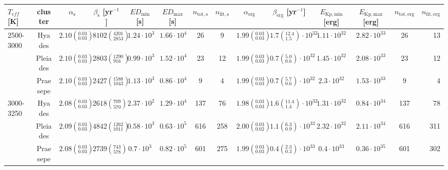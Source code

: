 \begin{tabular}{lccccccccccccr}
\hline\hline
 $T_{eff}$ [K] & cluster &            $\alpha_\mathrm{s}$ &     $\beta_\mathrm{s}$ [yr$^{-1}$] & $ED_\mathrm{min}$ [s] & $ED_\mathrm{max}$ [s] & $n_\mathrm{tot,s}$ & $n_\mathrm{fit,s}$ &              $\alpha_\mathrm{erg}$ &              $\beta_\mathrm{erg}$ [yr$^{-1}$] & $E_\mathrm{Kp,min}$ [erg] & $E_\mathrm{Kp,max}$ [erg] & $n_\mathrm{tot,erg}$ & $n_\mathrm{fit,erg}$ \\
\hline
2500-3000 & Hyades &  $2.10\left(^{0.03}_{0.03}\right)$ &  $8102\left(^{4201}_{2853}\right)$ &    $1.24\cdot 10^{3}$ &    $1.66\cdot 10^{4}$ &                 26 &                  9 &  $1.99\left(^{0.03}_{0.03}\right)$ &  $1.7\left(^{12.4}_{1.5}\right)\cdot 10^{32}$ &       $1.11\cdot 10^{32}$ &       $2.82\cdot 10^{33}$ &                   26 &                   13 \\
          & Pleiades &  $2.10\left(^{0.03}_{0.03}\right)$ &   $2803\left(^{1290}_{916}\right)$ &    $0.99\cdot 10^{3}$ &    $1.52\cdot 10^{4}$ &                 23 &                 12 &  $1.99\left(^{0.03}_{0.03}\right)$ &   $0.7\left(^{5.0}_{0.6}\right)\cdot 10^{32}$ &       $1.45\cdot 10^{32}$ &       $2.08\cdot 10^{33}$ &                   23 &                   12 \\
          & Praesepe &  $2.10\left(^{0.03}_{0.03}\right)$ &  $2427\left(^{1588}_{1043}\right)$ &    $1.13\cdot 10^{3}$ &    $0.86\cdot 10^{4}$ &                  9 &                  4 &  $1.99\left(^{0.03}_{0.03}\right)$ &   $0.7\left(^{5.7}_{0.6}\right)\cdot 10^{32}$ &        $2.3\cdot 10^{32}$ &       $1.53\cdot 10^{33}$ &                    9 &                    4 \\
3000-3250 & Hyades &  $2.08\left(^{0.03}_{0.03}\right)$ &    $2618\left(^{709}_{570}\right)$ &    $2.37\cdot 10^{2}$ &    $1.29\cdot 10^{4}$ &                137 &                 76 &  $1.98\left(^{0.03}_{0.03}\right)$ &  $1.6\left(^{11.4}_{1.4}\right)\cdot 10^{32}$ &       $1.31\cdot 10^{32}$ &       $0.84\cdot 10^{34}$ &                  137 &                   78 \\
          & Pleiades &  $2.09\left(^{0.03}_{0.03}\right)$ &  $4842\left(^{1262}_{1011}\right)$ &    $0.58\cdot 10^{3}$ &    $0.63\cdot 10^{5}$ &                616 &                258 &  $2.00\left(^{0.03}_{0.02}\right)$ &   $1.1\left(^{6.3}_{0.9}\right)\cdot 10^{33}$ &       $2.32\cdot 10^{32}$ &       $2.11\cdot 10^{34}$ &                  616 &                  311 \\
          & Praesepe &  $2.08\left(^{0.03}_{0.03}\right)$ &    $2739\left(^{743}_{578}\right)$ &     $0.7\cdot 10^{3}$ &    $0.82\cdot 10^{5}$ &                601 &                275 &  $1.99\left(^{0.03}_{0.03}\right)$ &   $0.4\left(^{2.3}_{0.3}\right)\cdot 10^{33}$ &        $0.4\cdot 10^{33}$ &       $0.36\cdot 10^{35}$ &                  601 &                  302 \\

\end{tabular}

